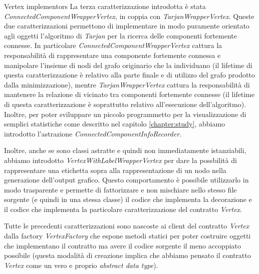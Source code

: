 \begin{paragraph}{Vertex implementors}
  La terza caratterizzazione introdotta \`e stata
  \emph{ConnectedComponentWrapperVertex}, in coppia con
  \emph{TarjanWrapperVertex}. Queste due caratterizzazioni permettono
  di implementare in modo puramente orientato agli oggetti l'algoritmo
  di \emph{Tarjan} per la ricerca delle componenti fortemente
  connesse. In particolare \emph{ConnectedComponentWrapperVertex}
  cattura la responsabilit\`a di rappresentare una componente
  fortemente connessa e manipolare l'insieme di nodi del grafo
  originario che la individuano (il lifetime di questa
  caratterizzazione \`e relativo alla parte finale e di utilizzo del
  grafo prodotto dalla minimizzazione), mentre
  \emph{TarjanWrapperVertex} cattura la responsabilit\`a di mantenere
  la relazione di vicinato tra componenti fortemente connesse (il
  lifetime di questa caratterizzazione \`e soprattutto relativo
  all'esecuzione dell'algoritmo). Inoltre, per poter sviluppare un
  piccolo programmetto per la visualizzazione di semplici statistiche
  come descritto nel capitolo \ref{chapter:study}, abbiamo introdotto
  l'astrazione \emph{ConnectedComponentInfoRecorder}.

  Inoltre, anche se sono classi astratte e quindi non immediatamente
  istanziabili, abbiamo introdotto \emph{VertexWithLabelWrapperVertex}
  per dare la possbilit\`a di rappresentare una etichetta sopra alla
  rappresentazione di un nodo nella generazione dell'output
  grafico. Questo comportamento \`e possibile utilizzarlo in modo
  trasparente e permette di fattorizzare e non mischiare nello stesso
  file sorgente (e quindi in una stessa classe) il codice che
  implementa la decorazione e il codice che implementa la particolare
  caratterizzazione del contratto \emph{Vertex}.

  Tutte le precedenti caratterizzazioni sono nascoste ai client del
  contratto \emph{Vertex} dalla factory \emph{VertexFactory} che
  espone metodi statici per poter costruire oggetti che implementano
  il contratto ma avere il codice sorgente il meno accoppiato
  possibile (questa modalit\`a di creazione implica che abbiamo
  pensato il contratto \emph{Vertex} come un vero e proprio
  \emph{abstract data type}).
\end{paragraph}

